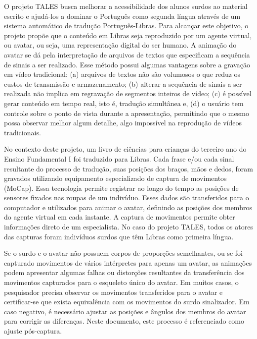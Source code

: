 \documentclass[a4paper,11pt,titlepage,singlespacing]{article}
\begin{document}
O projeto TALES busca melhorar a acessibilidade dos alunos surdos ao material escrito e ajudá-los a dominar o Português como segunda língua através de um sistema automático de tradução Português-Libras. Para alcançar este objetivo, o projeto propõe que o conteúdo em Libras%
seja reproduzido por um agente virtual, ou avatar, ou seja, uma representação digital do ser humano. A animação do avatar se dá pela interpretação de arquivos de textos que especificam a sequência de sinais a ser realizado. Esse método possui algumas vantagens sobre a gravação em vídeo tradicional: (a) arquivos de textos não são volumosos o que reduz os custos de transmissão e armazenamento; (b) alterar a sequência de sinais a ser realizada não implica em regravação de segmentos inteiros de vídeo; (c) é possível gerar conteúdo em tempo real, isto é, tradução simultânea e, (d) o usuário tem controle sobre o ponto de vista durante a apresentação, permitindo que o mesmo possa observar melhor algum detalhe, algo impossível na reprodução de vídeos tradicionais.

No contexto deste projeto, um livro de ciências para crianças do terceiro ano do Ensino Fundamental I foi traduzido para Libras. Cada frase e/ou cada sinal resultante do processo de tradução, suas posições dos braços, mãos e dedos, foram gravados utilizando equipamento especializado de captura de movimentos (MoCap). Essa tecnologia permite registrar ao longo do tempo as posições de sensores fixados nas roupas de um indivíduo. Esses dados são transferidos para o computador e utilizados para animar o avatar, definindo as posições dos membros do agente virtual em cada instante. A captura de movimentos permite obter informações direto de um especialista. No caso do projeto TALES, todos os atores das capturas foram indivíduos surdos que têm Libras como primeira língua. %

Se o surdo e o avatar não possuem corpos de proporções semelhantes, ou se foi capturado movimentos de vários intérpretes para apenas um avatar, as animações podem apresentar algumas falhas ou distorções resultantes da transferência dos movimentos capturados para o esqueleto único do avatar. Em muitos casos, o pesquisador precisa observar os movimentos transferidos para o avatar e certificar-se que exista equivalência com os movimentos do surdo sinalizador. Em caso negativo, é necessário ajustar as posições e ângulos dos membros do avatar para corrigir as diferenças. Neste documento, este processo é referenciado como ajuste pós-captura.%
\end{document}
